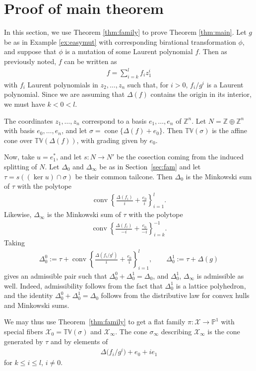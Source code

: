 \documentclass[pdftex]{sigma}
\newcommand{\ZZ}{\mathbb Z}
\newcommand{\PP}{\mathbb{P}}
\newcommand{\tv}{\mathbb{TV}}
\newcommand{\cX}{\mathcal{X}}
\DeclareMathOperator{\conv}{conv}
\DeclareMathOperator{\cone}{cone}
\begin{document}
\section{Proof of main theorem}\label{sec:main}

In this section, we use Theorem \ref{thm:family} to prove Theorem \ref{thm:main}. Let $g$ be as in Example \ref{ex:easymut} with corresponding birational transformation $\phi$, and suppose that $\phi$ is a mutation of some Laurent polynomial $f$. Then as previously noted,
$f$ can be written as
\begin{gather*}
f=\sum_{i=k}^l f_i z_1^i
\end{gather*}
with $f_i$ Laurent polynomials in $z_2,\ldots,z_n$ such that, for $i>0$, $f_i/g^i$ is a Laurent polynomial. Since we are assuming that $\Delta(f)$ contains the origin in its interior, we must have $k<0<l$.


The coordinates $z_1,\ldots,z_n$ correspond to a basis $e_1,\ldots,e_n$ of $\ZZ^n$.
Let $N=\ZZ\oplus \ZZ^n$ with basis $e_0,\ldots,e_n$, and let $\sigma=\cone\{\Delta(f)+e_0\}$. Then $\tv(\sigma)$ is the af\/f\/ine cone over $\tv(\Delta(f))$, with grading given by $e_0$.

Now, take $u=e_1^*$, and let $s:N\to N'$ be the cosection coming from the induced splitting of $N$.
Let $\Delta_0$ and $\Delta_\infty$ be as in Section~\ref{sec:fam}
and let $\tau= s( (\ker u)\cap \sigma)$ be their common tailcone.
Then $\Delta_0$ is the Minkowski sum of $\tau$ with the  polytope
\begin{gather*}
\conv \left \{\frac{\Delta(f_i)}{i}+\frac{e_0}{i}\right\}_{i=1}^l.
\end{gather*}
Likewise, $\Delta_\infty$ is the Minkowski sum of $\tau$ with the polytope
\begin{gather*}
\conv \left\{\frac{\Delta(f_i)}{-i}+\frac{e_0}{-i} \right\}_{i=k}^{-1}.
\end{gather*}
Taking
\begin{gather*}
\Delta_0^0 :=\tau+\conv \left \{\frac{\Delta(f_i/g^i)}{i}+\frac{e_0}{i}\right\}_{i=1}^l,\qquad
\Delta_0^1 :=\tau+\Delta(g)
\end{gather*}
gives an admissible pair such that $\Delta_0^0+\Delta_0^1=\Delta_0$, and $\Delta_0^1$, $\Delta_\infty$ is admissible as well. Indeed, admissibility follows from the fact that $\Delta_0^1$ is a lattice polyhedron, and the identity $\Delta_0^0+\Delta_0^1=\Delta_0$ follows from the distributive law for convex hulls and Minkowski sums.


We may thus use Theorem~\ref{thm:family} to get a f\/lat family $\pi:\cX\to\PP^1$ with special f\/ibers $\cX_0=\tv(\sigma)$ and $\cX_\infty$.
The cone $\sigma_\infty$ describing $\cX_\infty$ is the cone generated by $\tau$ and by elements of
\begin{gather*}
\Delta\big(f_i/g^i\big)+e_0+ie_1
\end{gather*}
for $k\leq i \leq l$, $i\neq 0$.
\end{document}
